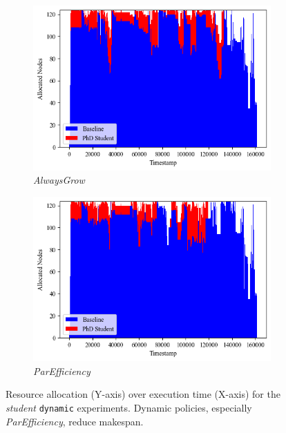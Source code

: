 \documentclass[a4paper,fleqn]{cas-dc}
\begin{document}
\begin{figure}[tbp]
    \centering

    \begin{subfigure}[t]{0.75\textwidth}
        \centering
        \includegraphics[clip, width=\linewidth, trim={0.1cm 1.15cm 0.1cm 0.2cm}]{figures/AlwaysGrow.png}
        \caption{\textit{AlwaysGrow}}
        \label{multifig:dyngrow}
        \vspace{3mm}
    \end{subfigure}

    \begin{subfigure}[t]{0.75\textwidth}
        \centering
        \includegraphics[clip, width=\linewidth, trim={0.1cm 0.1cm 0.1cm 0cm}]{figures/ParEfficiency.png}
        \caption{\textit{ParEfficiency}}
        \label{multifig:dynpe}
    \end{subfigure}

    \caption{
    Resource allocation (Y-axis) over execution time (X-axis) for the \textit{student} \texttt{dynamic} experiments. Dynamic policies, especially \textit{ParEfficiency}, reduce makespan.}
    \label{fig:dynamic-experiments}
\end{figure}
\end{document}
